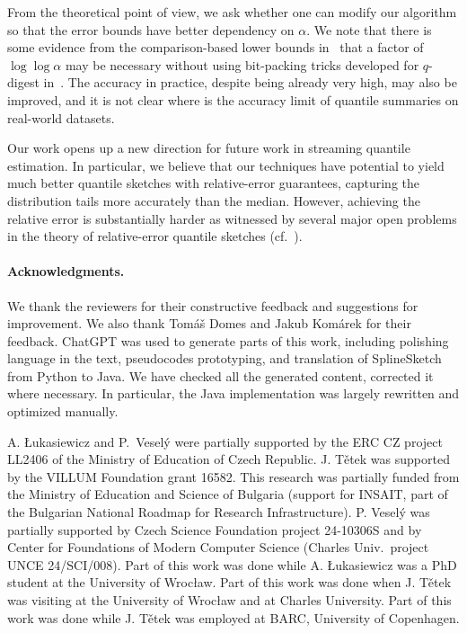 \documentclass[acmsmall]{acmart}
\theoremstyle{remark}
\begin{document}
From the theoretical point of view, we ask whether one can modify our algorithm so that the error bounds
have better dependency on $\alpha$. We note that there is some evidence from the
comparison-based lower bounds in~\cite{CormodeV20} that a factor of $\log \log \alpha$ may be necessary
without using bit-packing tricks developed for $q$-digest in~\cite{GuptaSW24optimaQS-non-comp}.
The accuracy in practice, despite being already very high, may also be improved,
and it is not clear where is the accuracy limit of quantile summaries on real-world datasets.


Our work opens up a new direction for future work in streaming quantile estimation.
In particular, we believe that our techniques
have potential to yield much better quantile sketches with relative-error guarantees,
capturing the distribution tails more accurately than the median.
However, achieving the relative error is substantially harder as witnessed by several 
major open problems in the theory of relative-error quantile sketches (cf.~\cite{CormodeV20,GribelyukSWY25elasticCompactors}).




\paragraph{Acknowledgments.}
We thank the reviewers for their constructive feedback and suggestions for improvement.
We also thank Tomáš Domes and Jakub Komárek for their feedback.
ChatGPT was used to generate parts of this work, including polishing language in the text, pseudocodes prototyping, and translation of SplineSketch from Python to Java.
We have checked all the generated content, corrected it where necessary.
In particular, the Java implementation was largely rewritten and optimized manually.

A. Łukasiewicz and P.~Veselý were partially supported by the ERC CZ project LL2406 of the Ministry of Education of Czech Republic.
J. Tětek was supported by the VILLUM Foundation grant 16582. This research was partially funded from the Ministry of Education and Science of Bulgaria (support for INSAIT, part of the Bulgarian National Roadmap for Research Infrastructure).
P. Veselý was partially supported by Czech Science Foundation project 24-10306S
and by Center for Foundations of Modern Computer Science (Charles Univ.\ project UNCE 24/SCI/008).
Part of this work was done while A. Łukasiewicz was a PhD student at the University of Wrocław.
Part of this work was done when J. Tětek was visiting at the University of Wrocław and at Charles University. Part of this work was done while J. Tětek was employed at BARC, University of Copenhagen.




\end{document}
